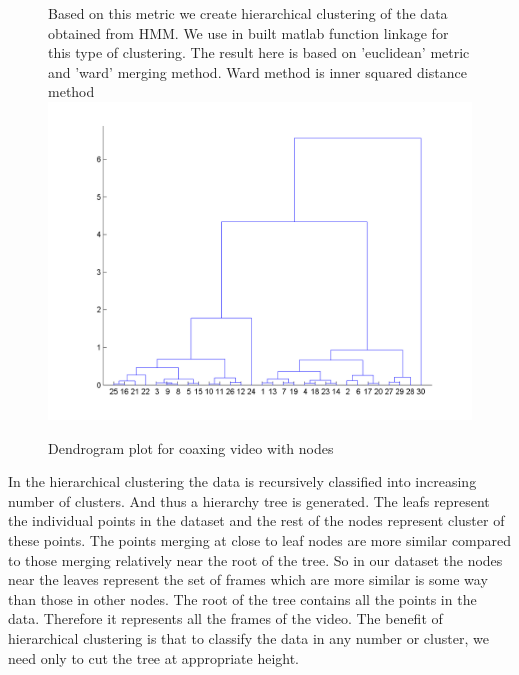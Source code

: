 \documentclass[11pt, twocolumn]{article}
\begin{document}
\begin{figure}[H]
\centering
Based on this metric we create hierarchical clustering of the data obtained from HMM. We use in built matlab function linkage for this type of clustering. The result here is based on 'euclidean' metric and 'ward' merging method. Ward method is inner squared distance method\\
\centering
\includegraphics[scale=0.3]{dendoCoax.png}
\caption{Dendrogram plot for coaxing video with  nodes}
\end{figure}

In the hierarchical clustering the data is recursively classified into increasing number of clusters. And thus a hierarchy tree is generated. The leafs represent the individual points in the dataset and the rest of the nodes represent cluster of these points.  The points merging at close to leaf nodes are more similar compared to those merging relatively near the root of the tree. So in our dataset the nodes near the leaves represent the set of frames which are more similar is some way than those in other nodes.
The root of the tree contains all the points in the data. Therefore it represents all the frames of the video. The benefit of hierarchical clustering is that to classify the data in any number or cluster, we need only to cut the tree at appropriate height.\\
\end{document}
